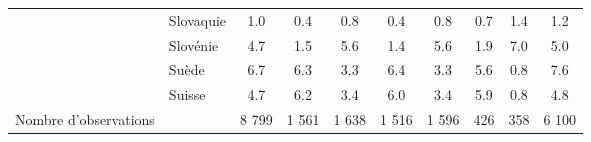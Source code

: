 \begin{Article}
\begin{refsection}[Bonnal]
\begin{appendices}
\begin{table}[!h]
{\begin{tabular}{l@{\;}l@{\;}S!{}S!{}S!{}S!{}S!{}S!{}S!{}S!{}}
		& Slovaquie & 1.0 & 0.4 & 0.8 & 0.4 & 0.8 & 0.7 &1.4 & 1.2 \\
		& Slovénie & 4.7 & 1.5 & 5.6 & 1.4 & 5.6 & 1.9 &7.0 & 5.0 \\
		& Suède & 6.7 & 6.3 & 3.3 & 6.4 & 3.3 & 5.6 & 0.8 & 7.6 \\
		& Suisse & 4.7 & 6.2 & 3.4 & 6.0 & 3.4 & 5.9 & 0.8 & 4.8 \\\hline
		Nombre d'observations && 8 799 & 1 561 & 1 638 & 1 516 & 1 596 & 426 & 358 & 6 100 \\\hline \hline
		\end{tabular}
	}
	\label{quali_variablesA}
\end{table}




\end{appendices}

\begin{table}
	\centering
	\caption{Résultats des estimations : modèle avec l'aide domestique formelle 
	et l'aide domestique informelle}
\end{table}
\end{refsection}
\end{Article}
